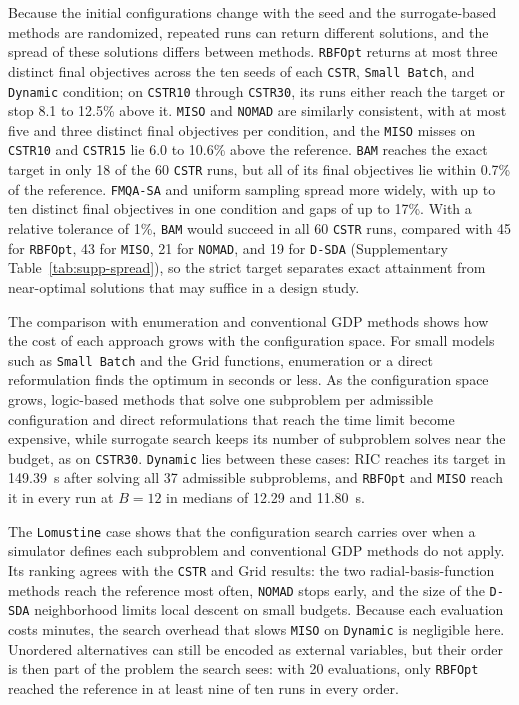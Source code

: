 \documentclass{article}
\begin{document}
Because the initial configurations change with the seed and the surrogate-based methods are randomized, repeated runs can return different solutions, and the spread of these solutions differs between methods.
\texttt{RBFOpt} returns at most three distinct final objectives across the ten seeds of each \texttt{CSTR}, \texttt{Small Batch}, and \texttt{Dynamic} condition; on \texttt{CSTR10} through \texttt{CSTR30}, its runs either reach the target or stop 8.1 to 12.5\% above it.
\texttt{MISO} and \texttt{NOMAD} are similarly consistent, with at most five and three distinct final objectives per condition, and the \texttt{MISO} misses on \texttt{CSTR10} and \texttt{CSTR15} lie 6.0 to 10.6\% above the reference.
\texttt{BAM} reaches the exact target in only 18 of the 60 \texttt{CSTR} runs, but all of its final objectives lie within 0.7\% of the reference.
\texttt{FMQA-SA} and uniform sampling spread more widely, with up to ten distinct final objectives in one condition and gaps of up to 17\%.
With a relative tolerance of 1\%, \texttt{BAM} would succeed in all 60 \texttt{CSTR} runs, compared with 45 for \texttt{RBFOpt}, 43 for \texttt{MISO}, 21 for \texttt{NOMAD}, and 19 for \texttt{D-SDA} (Supplementary Table~\ref{tab:supp-spread}), so the strict target separates exact attainment from near-optimal solutions that may suffice in a design study.

The comparison with enumeration and conventional GDP methods shows how the cost of each approach grows with the configuration space.
For small models such as \texttt{Small Batch} and the Grid functions, enumeration or a direct reformulation finds the optimum in seconds or less.
As the configuration space grows, logic-based methods that solve one subproblem per admissible configuration and direct reformulations that reach the time limit become expensive, while surrogate search keeps its number of subproblem solves near the budget, as on \texttt{CSTR30}.
\texttt{Dynamic} lies between these cases: RIC reaches its target in 149.39~s after solving all 37 admissible subproblems, and \texttt{RBFOpt} and \texttt{MISO} reach it in every run at \(B=12\) in medians of 12.29 and 11.80~s.

The \texttt{Lomustine} case shows that the configuration search carries over when a simulator defines each subproblem and conventional GDP methods do not apply.
Its ranking agrees with the \texttt{CSTR} and Grid results: the two radial-basis-function methods reach the reference most often, \texttt{NOMAD} stops early, and the size of the \texttt{D-SDA} neighborhood limits local descent on small budgets.
Because each evaluation costs minutes, the search overhead that slows \texttt{MISO} on \texttt{Dynamic} is negligible here.
Unordered alternatives can still be encoded as external variables, but their order is then part of the problem the search sees: with 20 evaluations, only \texttt{RBFOpt} reached the reference in at least nine of ten runs in every order.
\end{document}
